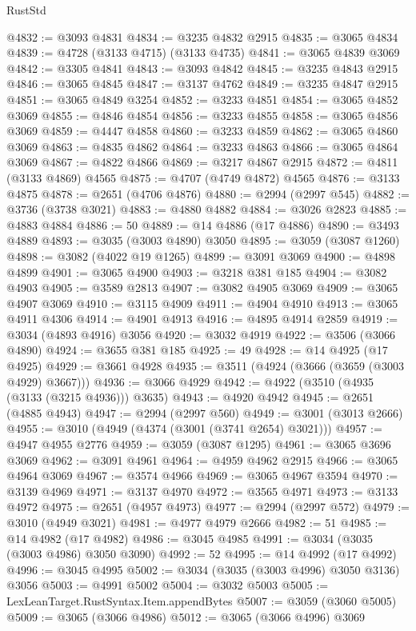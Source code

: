 \begin{lexlean}{RustStd}
\begin{coremodule}
@4832 := @3093 @4831
@4834 := @3235 @4832 @2915
@4835 := @3065 @4834
@4839 := @4728 (@3133 @4715) (@3133 @4735)
@4841 := @3065 @4839 @3069
@4842 := @3305 @4841
@4843 := @3093 @4842
@4845 := @3235 @4843 @2915
@4846 := @3065 @4845
@4847 := @3137 @4762
@4849 := @3235 @4847 @2915
@4851 := @3065 @4849 @3254
@4852 := @3233 @4851
@4854 := @3065 @4852 @3069
@4855 := @4846 @4854
@4856 := @3233 @4855
@4858 := @3065 @4856 @3069
@4859 := @4447 @4858
@4860 := @3233 @4859
@4862 := @3065 @4860 @3069
@4863 := @4835 @4862
@4864 := @3233 @4863
@4866 := @3065 @4864 @3069
@4867 := @4822 @4866
@4869 := @3217 @4867 @2915
@4872 := @4811 (@3133 @4869) @4565
@4875 := @4707 (@4749 @4872) @4565
@4876 := @3133 @4875
@4878 := @2651 (@4706 @4876)
@4880 := @2994 (@2997 @545)
@4882 := @3736 (@3738 @3021)
@4883 := @4880 @4882
@4884 := @3026 @2823
@4885 := @4883 @4884
@4886 := 50
@4889 := @14 @4886 (@17 @4886)
@4890 := @3493 @4889
@4893 := @3035 (@3003 @4890) @3050
@4895 := @3059 (@3087 @1260)
@4898 := @3082 (@4022 @19 @1265)
@4899 := @3091 @3069
@4900 := @4898 @4899
@4901 := @3065 @4900
@4903 := @3218 @381 @185
@4904 := @3082 @4903
@4905 := @3589 @2813
@4907 := @3082 @4905 @3069
@4909 := @3065 @4907 @3069
@4910 := @3115 @4909
@4911 := @4904 @4910
@4913 := @3065 @4911 @4306
@4914 := @4901 @4913
@4916 := @4895 @4914 @2859
@4919 := @3034 (@4893 @4916) @3056
@4920 := @3032 @4919
@4922 := @3506 (@3066 @4890)
@4924 := @3655 @381 @185
@4925 := 49
@4928 := @14 @4925 (@17 @4925)
@4929 := @3661 @4928
@4935 := @3511 (@4924 (@3666 (@3659 (@3003 @4929) @3667)))
@4936 := @3066 @4929
@4942 := @4922 (@3510 (@4935 (@3133 (@3215 @4936))) @3635)
@4943 := @4920 @4942
@4945 := @2651 (@4885 @4943)
@4947 := @2994 (@2997 @560)
@4949 := @3001 (@3013 @2666)
@4955 := @3010 (@4949 (@4374 (@3001 (@3741 @2654) @3021)))
@4957 := @4947 @4955 @2776
@4959 := @3059 (@3087 @1295)
@4961 := @3065 @3696 @3069
@4962 := @3091 @4961
@4964 := @4959 @4962 @2915
@4966 := @3065 @4964 @3069
@4967 := @3574 @4966
@4969 := @3065 @4967 @3594
@4970 := @3139 @4969
@4971 := @3137 @4970
@4972 := @3565 @4971
@4973 := @3133 @4972
@4975 := @2651 (@4957 @4973)
@4977 := @2994 (@2997 @572)
@4979 := @3010 (@4949 @3021)
@4981 := @4977 @4979 @2666
@4982 := 51
@4985 := @14 @4982 (@17 @4982)
@4986 := @3045 @4985
@4991 := @3034 (@3035 (@3003 @4986) @3050 @3090)
@4992 := 52
@4995 := @14 @4992 (@17 @4992)
@4996 := @3045 @4995
@5002 := @3034 (@3035 (@3003 @4996) @3050 @3136) @3056
@5003 := @4991 @5002
@5004 := @3032 @5003
@5005 := LexLeanTarget.RustSyntax.Item.appendBytes
@5007 := @3059 (@3060 @5005)
@5009 := @3065 (@3066 @4986)
@5012 := @3065 (@3066 @4996) @3069

\end{coremodule}
\end{lexlean}
